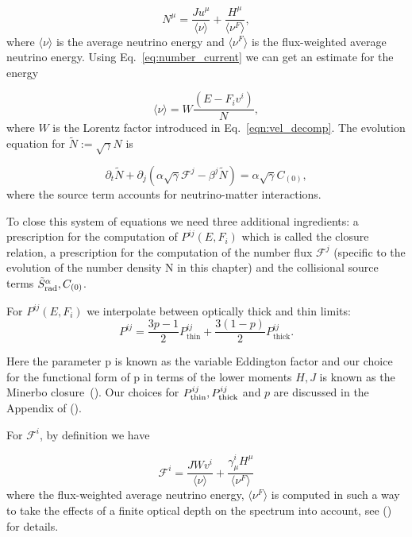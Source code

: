 \begin{equation}
  N^\mu = \frac{Ju^\mu}{\langle \nu \rangle} + \frac{H^\mu}{\langle \nu^F \rangle},
  \label{eq:number_current}
\end{equation}
%
where $\langle \nu \rangle$ is the average neutrino energy and $\langle \nu^F \rangle$ is the flux-weighted average neutrino energy. Using Eq.~\ref{eq:number_current} we can get an estimate for the energy

\begin{equation}
\langle \nu \rangle = W\frac{(E-F_iv^i)}{N},
\end{equation}
%
where $W$ is the Lorentz factor introduced in Eq.~\ref{eqn:vel_decomp}. The evolution equation for $\tilde{N} := \sqrt{\gamma}N$ is

\begin{equation}
  \partial_t \tilde N + \partial_j(\alpha \sqrt{\gamma} \mathcal{F}^j - \beta^j \tilde N) = \alpha \sqrt{\gamma} C_{(0)},
\end{equation}
where the source term accounts for neutrino-matter interactions.

To close this system of equations we need three additional ingredients: a prescription for the computation of $P^{ij}(E, F_i)$ which is called the closure relation, a prescription for the computation of the number flux $\mathcal{F}^j$ (specific to the evolution of the number density N in this chapter) and the collisional source terms $\tilde{S}^\alpha_{\rm rad}, C_{(0)}$.

For $P^{ij}(E, F_i)$  we interpolate between optically thick and thin limits:
%
\begin{equation}
P^{ij} = \frac{3p-1}{2}P^{ij}_{\text{thin}} + \frac{3(1-p)}{2}P^{ij}_{\text{thick}}.
\end{equation}

Here the parameter p is known as the variable Eddington factor and our choice for the functional form of p in terms of the lower moments $H,J$ is known as the Minerbo closure~(\citet*{minerbo1978}). Our choices for $P^{ij}_{\rm thin}, P^{ij}_{\rm thick}$ and $p$ are discussed in the Appendix of (\citet*{foucartm1:2015}).

For $\mathcal{F}^i$, by definition we have

\begin{equation}
  \mathcal{F}^i = \frac{JWv^i}{\langle \nu \rangle} + \frac{\gamma^i_\mu H^\mu}{\langle \nu^F \rangle}
\end{equation}
%
where the flux-weighted average neutrino energy,  $\langle \nu^F \rangle$ is computed in such a way to take the effects of a finite optical depth on the spectrum into account, see (\citet*{foucart:2015gaa}) for details.

